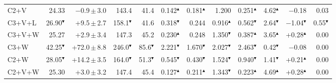 \begin{table}[t]
\begin{tabular}{@{}lrrrrrrrrrrr@{}}
C2+V & 24.33 & $-$0.9\,$\pm$\,3.0 & 143.4 & 41.4 & 0.142$^\blacktriangle$ & 0.181$^\blacktriangle$ & 1.200 & 0.251$^\blacktriangle$ & 4.62$^\blacktriangle$ & $-$0.18 & 0.03\\
C3+V+L & 26.90$^\blacktriangledown$ & +9.5\,$\pm$\,2.7 & 158.1$^\blacktriangledown$ & 41.6 & 0.318$^\blacktriangledown$ & 0.244 & 0.916$^\blacktriangle$ & 0.562$^\blacktriangledown$ & 2.64$^\blacktriangledown$ & $-$1.04$^\blacktriangledown$ & 0.55$^\blacktriangledown$\\
C3+V+W & 25.27 & +2.9\,$\pm$\,3.4 & 147.3 & 45.2 & 0.230$^\blacktriangle$ & 0.248 & 1.350$^\blacktriangledown$ & 0.387$^\blacktriangle$ & 3.65$^\blacktriangle$ & +0.28$^\blacktriangle$ & 0.00\\
C3+W & 42.25$^\blacktriangledown$ & +72.0\,$\pm$\,8.8 & 246.0$^\blacktriangledown$ & 85.6$^\blacktriangledown$ & 2.221$^\blacktriangledown$ & 1.670$^\blacktriangledown$ & 2.027$^\blacktriangledown$ & 2.463$^\blacktriangledown$ & 0.42$^\blacktriangledown$ & $-$0.08 & 0.00\\
C2+W & 28.05$^\blacktriangledown$ & +14.2\,$\pm$\,3.5 & 164.0$^\blacktriangledown$ & 51.3$^\blacktriangledown$ & 0.545$^\blacktriangledown$ & 0.430$^\blacktriangledown$ & 1.524$^\blacktriangledown$ & 0.940$^\blacktriangledown$ & 1.41$^\blacktriangledown$ & +0.21$^\blacktriangle$ & 0.00\\
C2+V+W & 25.30 & +3.0\,$\pm$\,3.2 & 147.4 & 45.4 & 0.127$^\blacktriangle$ & 0.211$^\blacktriangle$ & 1.343$^\blacktriangledown$ & 0.223$^\blacktriangle$ & 4.69$^\blacktriangle$ & +0.28$^\blacktriangle$ & 0.00\\
\bottomrule
\end{tabular}
\end{table}
